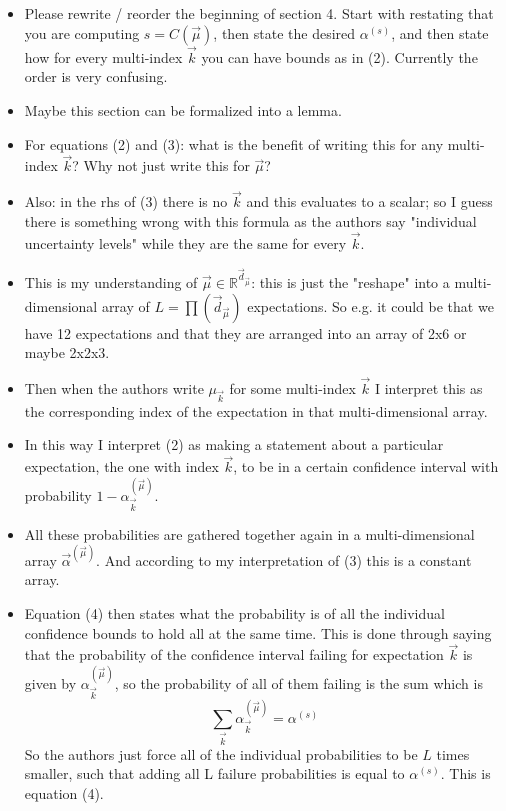 \documentclass{article}[12pt]
\newcommand{\Referee}[1]{{\color{blue} #1}}
\begin{document}
\begin{itemize}
    \item \Referee{Please rewrite / reorder the beginning of section 4. Start with restating that you are computing $s = C(\vec{\mu})$, then state the desired $\alpha^{(s)}$, and then state how for every multi-index $\vec{k}$ you can have bounds as in (2). Currently the order is very confusing.}
    \item \Referee{Maybe this section can be formalized into a lemma.}
    \item \Referee{For equations (2) and (3): what is the benefit of writing this for any multi-index $\vec{k}$? Why not just write this for $\vec{\mu}$?}
    \item \Referee{Also: in the rhs of (3) there is no $\vec{k}$ and this evaluates to a scalar; so I guess there is something wrong with this formula as the authors say "individual uncertainty levels" while they are the same for every $\vec{k}$.}
    \item \Referee{This is my understanding of $\vec{\mu} \in \mathbb{R}^{\vec{d}_{\vec{\mu}}}$: this is just the "reshape" into a multi-dimensional array of $L = \prod(\vec{d}_{\vec{\mu}})$ expectations. So e.g. it could be that we have 12 expectations and that they are arranged into an array of 2x6 or maybe 2x2x3.}
    \item \Referee{Then when the authors write $\mu_{\vec{k}}$ for some multi-index $\vec{k}$ I interpret this as the corresponding index of the expectation in that multi-dimensional array.}
    \item \Referee{In this way I interpret (2) as making a statement about a particular expectation, the one with index $\vec{k}$, to be in a certain confidence interval with probability $1 - \alpha_{\vec{k}}^{(\vec{\mu})}$.}
    \item \Referee{All these probabilities are gathered together again in a multi-dimensional array $\vec{\alpha}^{(\vec{\mu})}$. And according to my interpretation of (3) this is a constant array.}
    \item \Referee{Equation (4) then states what the probability is of all the individual confidence bounds to hold all at the same time. This is done through saying that the probability of the confidence interval failing for expectation $\vec{k}$ is given by $\alpha_{\vec{k}}^{(\vec{\mu})}$, so the probability of all of them failing is the sum which is
    $$\sum_{\vec{k}} \alpha_{\vec{k}}^{(\vec{\mu})} = \alpha^{(s)}$$
    So the authors just force all of the individual probabilities to be $L$ times smaller, such that adding all L failure probabilities is equal to $\alpha^{(s)}$. This is equation (4).}

\end{itemize}
\end{document}
